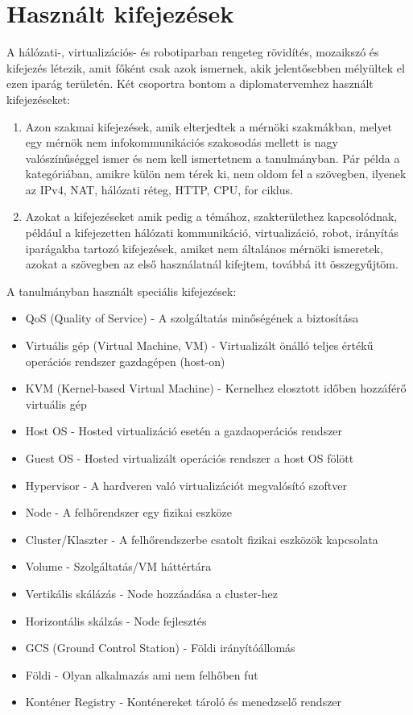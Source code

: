 \section{Használt kifejezések}
A hálózati-, virtualizációs- és robotiparban rengeteg rövidítés, mozaikszó és kifejezés létezik, amit főként csak azok ismernek, akik
jelentősebben mélyültek el ezen iparág területén. Két csoportra bontom a diplomatervemhez használt kifejezéseket:
\begin{enumerate}
	\item Azon szakmai kifejezések, amik elterjedtek a mérnöki szakmákban, melyet egy mérnök nem infokommunikációs szakosodás mellett is nagy valószínűséggel ismer és nem kell ismertetnem a tanulmányban. Pár példa a kategóriában, amikre külön nem térek ki, nem oldom fel a szövegben, ilyenek az IPv4, NAT, hálózati réteg, HTTP, CPU, for ciklus.
	\item Azokat a kifejezéseket amik pedig a témához, szakterülethez kapcsolódnak, például a kifejezetten hálózati kommunikáció, virtualizáció, robot, irányítás iparágakba tartozó kifejezések, amiket nem általános mérnöki ismeretek, azokat a szövegben az első használatnál kifejtem, továbbá itt összegyűjtöm.
\end{enumerate}
A tanulmányban használt speciális kifejezések:
\begin{itemize}
	\item QoS (Quality of Service) - A szolgáltatás minőségének a biztosítása
	\item Virtuális gép (Virtual Machine, VM) - Virtualizált önálló teljes értékű operációs rendszer gazdagépen (host-on)
	\item KVM (Kernel-based Virtual Machine) - Kernelhez elosztott időben hozzáférő virtuális gép
	\item Host OS - Hosted virtualizáció esetén a gazdaoperációs rendszer
	\item Guest OS - Hosted virtualizált operációs rendszer a host OS fölött
	\item Hypervisor - A hardveren való virtualizációt megvalósító szoftver
	\item Node - A felhőrendszer egy fizikai eszköze
	\item Cluster/Klaszter - A felhőrendszerbe csatolt fizikai eszközök kapcsolata
	\item Volume - Szolgáltatás/VM háttértára
	\item Vertikális skálázás - Node hozzáadása a cluster-hez
	\item Horizontális skálzás - Node fejlesztés
	\item GCS (Ground Control Station) - Földi irányítóállomás
	\item Földi - Olyan alkalmazás ami nem felhőben fut
	\item Konténer Registry - Konténereket tároló és menedzselő rendszer
\end{itemize}